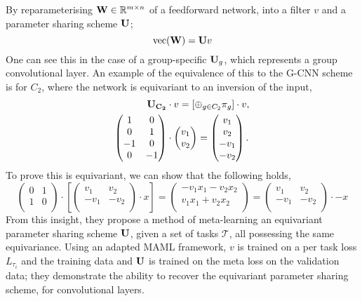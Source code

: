 By reparameterising $\mathbf{W} \in \mathbb{R}^{m \times n}$ of a feedforward network, into a filter $v$ and a parameter sharing scheme $\mathbf{U}$;
\begin{equation}
	\text{vec}(\mathbf{W}) = \mathbf{U}v
\end{equation}
One can see this in the case of a group-specific $\mathbf{U}_g$, which represents a group convolutional layer.
An example of the equivalence of this to the G-CNN scheme is for $C_2$, where the network is equivariant to an inversion of the input,
\begin{align}
	\mathbf{U_{C_2}}   & \cdot v  = [\oplus_{g \in C_2} \pi_g] \cdot v, \\
	\begin{pmatrix}
		1  & 0  \\
		0  & 1  \\
		-1 & 0  \\
		0  & -1 \\
	\end{pmatrix} & \cdot
	\begin{pmatrix}
		v_1 \\
		v_2 \\
	\end{pmatrix}
	= \begin{pmatrix}
		  v_1  \\
		  v_2  \\
		  -v_1 \\
		  -v_2 \\
	  \end{pmatrix}.
\end{align}
To prove this is equivariant, we can show that the following holds,
\begin{equation}
	\begin{pmatrix}
		0 & 1 \\
		1 & 0 \\
	\end{pmatrix} \cdot \left[
		\begin{pmatrix}
			v_1  & v_2  \\
			-v_1 & -v_2 \\
		\end{pmatrix} \cdot x \right] = \begin{pmatrix}
		-v_1 x_1 - v_2 x_2 \\
		v_1 x_1 + v_2 x_2  \\
	\end{pmatrix}
	= \begin{pmatrix}
		v_1  & v_2  \\
		-v_1 & -v_2 \\
	\end{pmatrix} \cdot  -x
\end{equation}
From this insight, they propose a method of meta-learning an equivariant parameter sharing scheme $\mathbf{U}$, given a set of tasks $\mathcal{T}$, all possessing the same equivariance.
Using an adapted MAML framework, $v$ is trained on a per task loss $L_{\tau_i}$ and the training data and $\mathbf{U}$ is trained on the meta loss on the validation data; they demonstrate the ability to recover the equivariant parameter sharing scheme, for convolutional layers.



